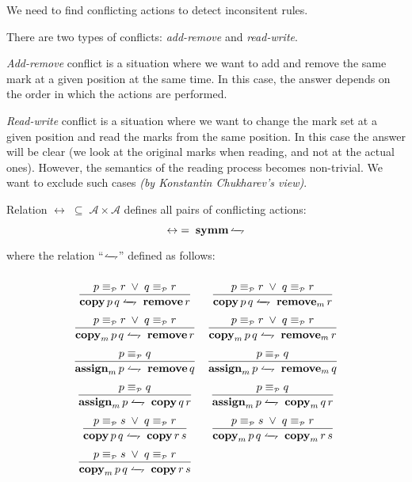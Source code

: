 \documentclass{article}
\newcommand{\primi}[1]{\mathbf{#1}}
\newcommand{\lrharpoon}{
  \mathrlap{\leftharpoonup}%
  \rightharpoondown
}
\newcommand{\trule}[2]{\dfrac{#1}{#2}}
\newcommand{\cActions}{\leftrightarrow}
\newcommand{\pEquiv}{\equiv_{\scriptscriptstyle{\mathcal{P}}}}
\begin{document}
We need to find conflicting actions to detect inconsitent rules.

There are two types of conflicts: \textit{add-remove} and \textit{read-write}.

\textit{Add-remove} conflict is a situation where we want to add and remove the same mark at a given position at the same time. In this case, the answer depends on the order in which the actions are performed.

\textit{Read-write} conflict is a situation where we want to change the mark set at a given position and read the marks from the same position. In this case the answer will be clear (we look at the original marks when reading, and not at the actual ones). However, the semantics of the reading process becomes non-trivial. We want to exclude such cases \textit{(by Konstantin Chukharev's view)}.


\noindent Relation $\cActions\;\subseteq\;\mathcal{A}\times\mathcal{A}$ defines all pairs of conflicting actions:

\[
\cActions \;=\;\primi{symm}\,\lrharpoon
\]

where the relation ``$\lrharpoon$'' defined as follows:

\[
\renewcommand{\arraystretch}{2.5}
\renewcommand{\cActions}{\lrharpoon}
\begin{array}{cc}
\trule
    {p\pEquiv r\;\vee\; q\pEquiv r}
    {{\primi{copy}\,p\,q}\;\cActions\;{\primi{remove}\,r}}
    &
\trule
    {p\pEquiv r\;\vee\; q\pEquiv r}
    {{\primi{copy}\,p\,q}\;\cActions\;{\primi{remove}_m\,r}}\\

\trule
    {p\pEquiv r\;\vee\; q\pEquiv r}
    {{\primi{copy}_m\,p\,q}\;\cActions\;{\primi{remove}\,r}}
    &
\trule
    {p\pEquiv r\;\vee\; q\pEquiv r}
    {{\primi{copy}_m\,p\,q}\;\cActions\;{\primi{remove}_m\,r}}\\

\trule
    {p\pEquiv q}
    {{\primi{assign}_m\,p}\;\cActions\;{\primi{remove}\,q}}
    &
\trule
    {p\pEquiv q}
    {{\primi{assign}_m\,p}\;\cActions\;{\primi{remove}_m\,q}}\\

\trule
    {p\pEquiv q}
    {{\primi{assign}_m\,p}\;\cActions\;{\primi{copy}\,q\,r}}
    &
\trule
    {p\pEquiv q}
    {{\primi{assign}_m\,p}\;\cActions\;{\primi{copy}_m\,q\,r}}\\
    
\trule
    {p\pEquiv s\;\vee\;q\pEquiv r}
    {{\primi{copy}\,p\,q}\;\cActions\;{\primi{copy}\,r\,s}}
    &
\trule
    {p\pEquiv s\;\vee\;q\pEquiv r}
    {{\primi{copy}_m\,p\,q}\;\cActions\;{\primi{copy}_m\,r\,s}}\\

\trule
    {p\pEquiv s\;\vee\;q\pEquiv r}
    {{\primi{copy}_m\,p\,q}\;\cActions\;{\primi{copy}\,r\,s}}
    &
\end{array}
\]
\end{document}
